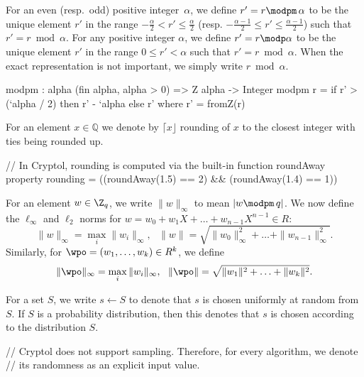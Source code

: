 For an even (resp.\ odd) positive integer~$\alpha$, 
we define $r'=r\modpm\, \alpha$ to be the unique element 
$r'$ in the range $-\frac{\alpha}{2}<r'\leq\frac{\alpha}{2}$ 
(resp. $-\frac{\alpha-1}{2}\leq r'\leq \frac{\alpha-1}{2}$) such that $r'=r\bmod \alpha$. 
For any positive integer $\alpha$, 
we define $r'=r\modp \alpha$ to be the unique element $r'$ 
in the range $0\leq r'<\alpha$ such that $r'=r\bmod \alpha$. 
When the exact representation is not important, we simply write $r\bmod \alpha$.  

\begin{code}
  modpm : {alpha} (fin alpha, alpha > 0) => Z alpha -> Integer
  modpm r = if r' > (`alpha / 2) then r' - `alpha else r'
    where r' = fromZ(r)
\end{code}

For an element $x \in \mathbb{Q}$ we denote by $\lceil x \rfloor$ 
rounding of $x$ to the closest integer with ties being rounded up.

\begin{code}
  // In Cryptol, rounding is computed via the built-in function roundAway
  property rounding = ((roundAway(1.5) == 2) && (roundAway(1.4) == 1))
\end{code}

For an element $w\in\Z_q$, we write $\|w\|_\infty$ to mean $|w\modpm\, q|$.  
We now define the $\ell_\infty$ and $\ell_2$ norms for 
$w=w_0+w_1X+\ldots +w_{n-1}X^{n-1}\in R$: 
$$\|w\|_\infty=\max_{i}{\|w_i\|_\infty},\,\,\,\, \|w\|=\sqrt{\|w_0\|_\infty^2+\ldots+\|w_{n-1}\|_\infty^2}.$$   
Similarly, for $\wpo=(w_1,\ldots,w_k)\in R^k$, we define 
$$\|\wpo\|_\infty=\max_{i}{\|w_i\|_\infty},\,\,\,\, \|\wpo\|=\sqrt{\|w_1\|^2+\ldots+\|w_k\|^2}.$$

For a set $S$, we write $s\gets S$ to denote that $s$ is chosen uniformly at random from $S$.  
If $S$ is a probability distribution, then this denotes that $s$ is chosen according to the distribution $S$.  

\begin{code}
  // Cryptol does not support sampling. Therefore, for every algorithm, we denote
  // its randomness as an explicit input value.
\end{code}

